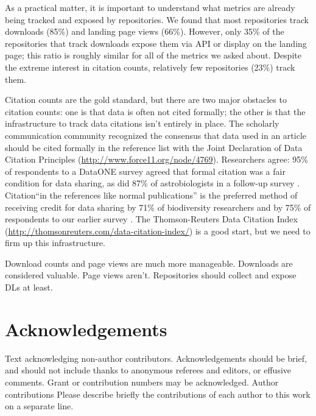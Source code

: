 \documentclass[english]{article}
\begin{document}
As a practical matter, it is important to understand what metrics are already being tracked and exposed by repositories. 
We found that most repositories track downloads (85\%) and landing page views (66\%). 
However, only 35\% of the repositories that track downloads expose them via API or display on the landing page; this ratio is roughly similar for all of the metrics we asked about. 
Despite the extreme interest in citation counts, relatively few repositories (23\%) track them. 


Citation counts are the gold standard, but there are two major obstacles to citation counts: one is that data is often not cited formally; the other is that the infrastructure to track data citations isn't entirely in place.
The scholarly communication community recognized the consensus that data used in an article should be cited formally in the reference list with the Joint Declaration of Data Citation Principles (\url{http://www.force11.org/node/4769}). 
Researchers agree: 95\% of respondents to a DataONE survey agreed that formal citation was a fair condition for data sharing, as did 87\% of astrobiologists in a follow-up survey \cite{@tenopir_data_2011, @aydinoglu_data_2014}. 
Citation``in the references like normal publications'' is the preferred method of receiving credit for data sharing by 71\% of biodiversity researchers and by 75\% of respondents to our earlier survey \cite{@enke_users_2012, @kratz_researcher_2015}.
The Thomson-Reuters Data Citation Index (\url{http://thomsonreuters.com/data-citation-index/}) is a good start, but we need to firm up this infrastructure.

Download counts and page views are much more manageable.
Downloads are considered valuable.
Page views aren't.
Repositories should collect and expose DLs at least.



\section*{Acknowledgements}


Text acknowledging non-author contributors. Acknowledgements should
be brief, and should not include thanks to anonymous referees and
editors, or effusive comments. Grant or contribution numbers may be
acknowledged. Author contributions Please describe briefly the contributions
of each author to this work on a separate line. 
\end{document}
